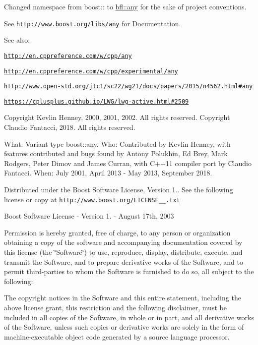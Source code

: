 Changed namespace from boost\+:\+: to \mbox{\hyperlink{namespacebfl_1_1any}{bfl\+::any}} for the sake of project conventions.

See \href{http://www.boost.org/libs/any}{\tt http\+://www.\+boost.\+org/libs/any} for Documentation.

See also\+:
\begin{DoxyItemize}
\item \href{http://en.cppreference.com/w/cpp/any}{\tt http\+://en.\+cppreference.\+com/w/cpp/any}
\item \href{http://en.cppreference.com/w/cpp/experimental/any}{\tt http\+://en.\+cppreference.\+com/w/cpp/experimental/any}
\item \href{http://www.open-std.org/jtc1/sc22/wg21/docs/papers/2015/n4562.html#any}{\tt http\+://www.\+open-\/std.\+org/jtc1/sc22/wg21/docs/papers/2015/n4562.\+html\#any}
\item \href{https://cplusplus.github.io/LWG/lwg-active.html#2509}{\tt https\+://cplusplus.\+github.\+io/\+L\+W\+G/lwg-\/active.\+html\#2509}
\end{DoxyItemize}

Copyright Kevlin Henney, 2000, 2001, 2002. All rights reserved. Copyright Claudio Fantacci, 2018. All rights reserved.

What\+: Variant type boost\+::any. Who\+: Contributed by Kevlin Henney, with features contributed and bugs found by Antony Polukhin, Ed Brey, Mark Rodgers, Peter Dimov and James Curran, with C++11 compiler port by Claudio Fantacci. When\+: July 2001, April 2013 -\/ May 2013, September 2018.

Distributed under the Boost Software License, Version 1.. See the following license or copy at \href{http://www.boost.org/LICENSE_1_0.txt}{\tt http\+://www.\+boost.\+org/\+L\+I\+C\+E\+N\+S\+E\+\_\+\_.\+txt}

Boost Software License -\/ Version 1. -\/ August 17th, 2003

Permission is hereby granted, free of charge, to any person or organization obtaining a copy of the software and accompanying documentation covered by this license (the \char`\"{}\+Software\char`\"{}) to use, reproduce, display, distribute, execute, and transmit the Software, and to prepare derivative works of the Software, and to permit third-\/parties to whom the Software is furnished to do so, all subject to the following\+:

The copyright notices in the Software and this entire statement, including the above license grant, this restriction and the following disclaimer, must be included in all copies of the Software, in whole or in part, and all derivative works of the Software, unless such copies or derivative works are solely in the form of machine-\/executable object code generated by a source language processor.

